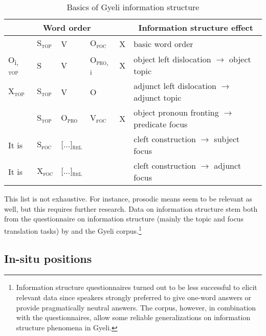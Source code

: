 \begin{table}[!h]
\centering
\begin{tabular}{p{.8cm}p{.8cm}p{.8cm}p{.8cm}p{.5cm}|l}
 \midrule
\multicolumn{5}{c|}{Word order} & \multicolumn{1}{c}{Information structure effect} \\
 \midrule
 & S\textsubscript{{\textsc{top}}} & V & O\textsubscript{{\textsc{foc}}} & X & basic word order \\
 O\textsubscript{i, {\textsc{top}}} & S & V & O\textsubscript{{\textsc{pro}}, i} & X & object left dislocation $\rightarrow$ object topic \\
X\textsubscript{{\textsc{top}}} & S\textsubscript{{\textsc{top}}} &  V & O &  & adjunct left dislocation $\rightarrow$ adjunct topic \\ 
 & S\textsubscript{{\textsc{top}}} & O\textsubscript{{\textsc{pro}}} & V\textsubscript{{\textsc{foc}}} & X & object pronoun fronting $\rightarrow$ predicate focus   \\

It is & S\textsubscript{{\textsc{foc}}} & [...]\textsubscript{{\textsc{rel}}} & & & cleft construction $\rightarrow$ subject focus \\
It is & X\textsubscript{{\textsc{foc}}} & [...]\textsubscript{{\textsc{rel}}} & & & cleft construction $\rightarrow$ adjunct focus \\
 \midrule
\end{tabular}
\caption{Basics of Gyeli information structure}
\label{Tab:IS}
\end{table}


\noindent This list is not exhaustive. For instance, prosodic means seem to be relevant as well, but this requires further research.  Data on information structure stem both from the questionnaire on information structure (mainly the topic and focus translation tasks) by \citet{skopeteas2006} and the Gyeli corpus.\footnote{Information structure questionnaires turned out to be less successful to elicit relevant data since speakers strongly preferred to give one-word answers or provide pragmatically neutral answers. The corpus, however, in combination with the questionnaires, allow some reliable generalizations on information structure phenomena in Gyeli.} 



 


\subsection{In-situ positions}

